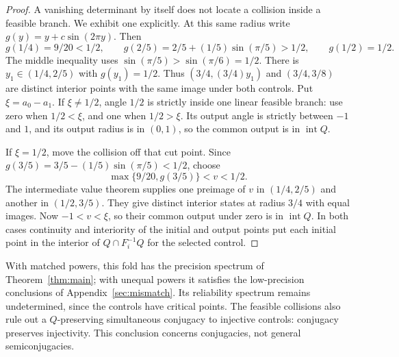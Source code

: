 \documentclass[11pt]{amsart}
\theoremstyle{definition}
\theoremstyle{remark}
\numberwithin{equation}{section}
\begin{document}
\begin{proof}
A vanishing determinant by itself does not locate a collision
inside a feasible branch. We exhibit one explicitly. At this same
radius write $g(y)=y+c\sin(2\pi y)$. Then
\[
g(1/4)=9/20<1/2,\qquad
g(2/5)=2/5+(1/5)\sin(\pi/5)>1/2,\qquad g(1/2)=1/2.
\]
The middle inequality uses $\sin(\pi/5)>\sin(\pi/6)=1/2$.
There is $y_1\in(1/4,2/5)$ with $g(y_1)=1/2$.
Thus $(3/4,(3/4)y_1)$ and $(3/4,3/8)$ are distinct interior
points with the same image under both controls. Put $\xi=a_0-a_1$.
If $\xi\ne1/2$, angle $1/2$ is strictly inside one linear
feasible branch: use zero when $1/2<\xi$, and one when $1/2>\xi$.
Its output angle is strictly between $-1$ and $1$, and its
output radius is in $(0,1)$, so the common output is in
$\operatorname{int}Q$.

If $\xi=1/2$, move the collision off that cut point.
Since $g(3/5)=3/5-(1/5)\sin(\pi/5)<1/2$, choose
\[
\max\{9/20,g(3/5)\}<v<1/2.
\]
The intermediate value theorem supplies one preimage of $v$
in $(1/4,2/5)$ and another in $(1/2,3/5)$. They give distinct
interior states at radius $3/4$ with equal images. Now
$-1<v<\xi$, so their common output under zero is in
$\operatorname{int}Q$. In both cases continuity and interiority
of the initial and output points put each initial point in the
interior of $Q\cap F_i^{-1}Q$ for the selected control.
\end{proof}

With matched powers, this fold has the precision spectrum of
Theorem~\ref{thm:main}; with unequal powers it satisfies the
low-precision conclusions of Appendix~\ref{sec:mismatch}.
Its reliability spectrum remains undetermined, since the controls
have critical points. The feasible collisions also rule out a
$Q$-preserving simultaneous conjugacy to injective controls:
conjugacy preserves injectivity. This conclusion concerns conjugacies,
not general semiconjugacies.
\end{document}
